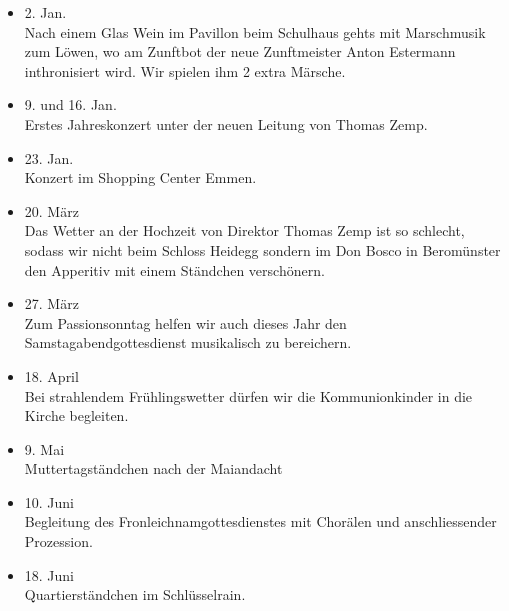 \begin{multicols}{2}


    \begin{itemize}

        \item[]2. Jan.\\
        Nach einem Glas Wein im Pavillon beim Schulhaus gehts mit Marschmusik
        zum Löwen, wo am Zunftbot der neue Zunftmeister Anton Estermann
        inthronisiert wird. Wir spielen ihm 2 extra Märsche.

        \item[]9. und 16. Jan.\\
        Erstes Jahreskonzert unter der neuen Leitung von Thomas Zemp.

        \item[]23. Jan.\\
        Konzert im Shopping Center Emmen.

        \item[]20. März\\
        Das Wetter an der Hochzeit von Direktor Thomas Zemp ist so schlecht,
        sodass wir nicht beim Schloss Heidegg sondern im Don Bosco in
        Beromünster den Apperitiv mit einem Ständchen verschönern.

        \item[]27. März\\
        Zum Passionsonntag helfen wir auch dieses Jahr den
        Samstagabendgottesdienst musikalisch zu bereichern.

        \item[]18. April\\
        Bei strahlendem Frühlingswetter dürfen wir die Kommunionkinder in die
        Kirche begleiten.

        \item[]9. Mai\\
        Muttertagständchen nach der Maiandacht

        \item[]10. Juni\\
        Begleitung des Fronleichnamgottesdienstes mit Chorälen und
        anschliessender Prozession.

        \item[]18. Juni\\
        Quartierständchen im Schlüsselrain.


\end{itemize}
\end{multicols}
